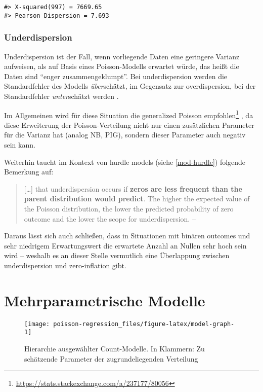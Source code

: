 \documentclass[ngerman,a4paper,]{scrartcl}
\renewcommand{\href}[2]{#2\footnote{\url{#1}}}
\let\rmarkdownfootnote\footnote%
\def\footnote{\protect\rmarkdownfootnote}
\theoremstyle{definition}
\theoremstyle{definition}
\theoremstyle{definition}
\theoremstyle{remark}
\begin{document}
\begin{verbatim}
#> X-squared(997) = 7669.65
#> Pearson Dispersion = 7.693
\end{verbatim}

\hypertarget{underdispersion}{%
\subsubsection{Underdispersion}\label{underdispersion}}

Underdispersion ist der Fall, wenn vorliegende Daten eine geringere Varianz aufweisen, als auf Basis eines Poisson-Modells erwartet würde, das heißt die Daten sind \enquote{enger zusammengeklumpt}.
Bei underdispersion werden die Standardfehler des Modells \emph{über}schätzt, im Gegensatz zur overdispersion, bei der Standardfehler \emph{unter}schätzt werden \citep[p.~210]{hilbeModelingCountData2014}.

Im Allgemeinen wird für diese Situation die \href{https://stats.stackexchange.com/a/237177/80056}{generalized Poisson empfohlen} \citep{hilbeModelingCountData2014}, da diese Erweiterung der Poisson-Verteilung nicht nur einen zusätzlichen Parameter für die Varianz hat (analog NB, PIG), sondern dieser Parameter auch negativ sein kann.

Weiterhin taucht im Kontext von hurdle models (siehe \ref{mod-hurdle}) folgende Bemerkung auf:

\begin{quote}
{[}\ldots{}{]} that underdispersion occurs if \textbf{zeros are less frequent than the parent distribution would predict}.
The higher the expected value of the Poisson distribution, the lower the predicted probability of zero outcome and the lower the scope for underdispersion.
-- \citep[p.~180 (eigene Hervorhebung)]{winkelmannEconometricAnalysisCount2010}
\end{quote}

Daraus lässt sich auch schließen, dass in Situationen mit binären outcomes und sehr niedrigem Erwartungswert die erwartete Anzahl an Nullen sehr hoch sein wird -- weshalb es an dieser Stelle vermutlich eine Überlappung zwischen underdispersion und zero-inflation gibt.

\hypertarget{multiparam}{%
\section{Mehrparametrische Modelle}\label{multiparam}}

\begin{figure}

{\centering \texttt{[image: poisson-regression\_files/figure-latex/model-graph-1]} 

}

\caption{Hierarchie ausgewählter Count-Modelle. In Klammern: Zu schätzende Parameter der zugrundeliegenden Verteilung}\label{fig:model-graph}
\end{figure}
\end{document}
